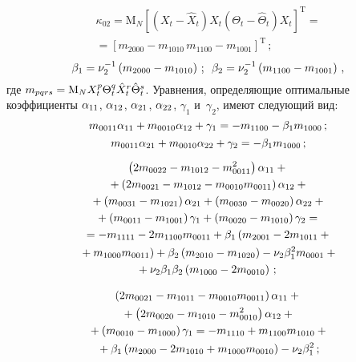\begin{multicols}{2}
{    \vspace*{-10pt}

    \noindent
    \begin{multline*}
    \kappa_{02} = \mathrm{M}_N\left[ \left(X_t-\hat{X}_t\right) X_t\left (
    \Theta_t -\hat \Theta_t\right)X_t\right]^{\mathrm{T}} ={}\\
    {}=
    \left[ m_{2000} -m_{1010}\, m_{1100}- m_{1001}\right]^{\mathrm{T}}\,; %
    \end{multline*}
    \begin{equation*}
   \beta_1 =\nu_2^{-1} \left(m_{2000}-m_{1010}\right)\,;\enskip \beta_2 =\nu_2^{-1} \left(m_{1100}-m_{1001}\right)\,, %
   \end{equation*}
где  $m_{pqrs}\hm=\mathrm{M}_N X_t^p \Theta_t^q \hat{X}_t^r\hat\Theta_t^s$.
Уравнения,  определяющие оптимальные
коэффициенты $\alpha_{11}$, $\alpha_{12}$, $\alpha_{21}$, $\alpha_{22}$,
$\gamma_1$ и~$\gamma_2$, имеют следующий вид:
    $$
    m_{0011}\alp_{11} +m_{0010}\alp_{12}+\gamma_1 =- m_{1100}-\beta_1 m_{1000}\,; %
    $$
    $$
    m_{0011}\alpha_{21} +m_{0010}\alpha_{22}+\gamma_2 =- \beta_1 m_{1000}\,;
    $$

    \vspace*{-10pt}

    \noindent
    \begin{multline*}
        \left(2m_{0022} -m_{1012}- m_{0011}^2\right)\alpha_{11}+{}\\
        {}+\left(2m_{0021} -m_{1012}- m_{0010}m_{0011}\right)\alpha_{12}+{}\\
{}+ \left(m_{0031} -m_{1021}\right)\alpha_{21}+\left(m_{0030} -m_{0020}\right)\alpha_{22}+{}\\
{}+\left(m_{0011} -m_{1001}\right)\gamma_1+ \left(m_{0020} -m_{1010}\right)\gamma_2={}\\
{}=- m_{1111} -2m_{1100}m_{0011}+ \beta_1 \left(m_{2001}-2m_{1011}+{}\right.\\
\left.{}+m_{1000} m_{0011}\right)+ \beta_2 \left(m_{2010}-m_{1020}\right) -\nu_2 \beta_1^2 m_{0001} +{}\\
{}+\nu_2 \beta_1\beta_2
    \left(m_{1000}-2m_{0010}\right)\,;\
    \end{multline*}

     \vspace*{-10pt}

    \noindent
    \begin{multline*}
   \left(2m_{0021}-m_{1011}-m_{0010}m_{0011}\right)\alpha_{11} + {}\\
   {}+\left(2m_{0020}-m_{1010}-m_{0010}^2\right)\alpha_{12}+{}\\
{}+ \left(m_{0010}-m_{1000}\right)\gamma_1 =- m_{1110}+m_{1100}m_{1010}+{}\\
{}+ \beta_1 \left(m_{2000}- 2m_{1010}+m_{1000}m_{0010}\right)-\nu_2\beta_1^2\,;
\end{multline*}

}
\end{multicols}
